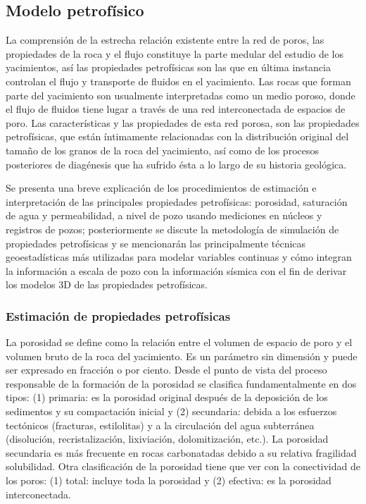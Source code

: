 \subsection{Modelo petrof\'isico}

La comprensi\'on de la estrecha relaci\'on existente entre la red de poros, las propiedades de la roca y el flujo constituye la parte medular del estudio de los yacimientos, as\'i las propiedades petrof\'isicas son las que en \'ultima instancia controlan el flujo y transporte de fluidos en el yacimiento. Las rocas que forman parte del yacimiento son usualmente interpretadas como un medio poroso, donde el flujo de fluidos tiene lugar a trav\'es de una red interconectada de espacios de poro. Las caracter\'isticas y las propiedades de esta red porosa, son las propiedades petrof\'isicas, que est\'an \'intimamente relacionadas con la distribuci\'on original del tama\~no de los granos de la roca del yacimiento, as\'i como de los procesos posteriores de diag\'enesis que ha sufrido \'esta a lo largo de su historia geol\'ogica.

Se presenta una breve explicaci\'on de los procedimientos de estimaci\'on e interpretaci\'on de las principales propiedades petrof\'isicas: porosidad, saturaci\'on de agua y permeabilidad, a nivel de pozo usando mediciones en n\'ucleos y registros de pozos; posteriormente se discute la metodolog\'ia de simulaci\'on de propiedades petrof\'isicas y se mencionar\'an las principalmente t\'ecnicas geoestad\'isticas m\'as utilizadas para modelar variables continuas y c\'omo integran la informaci\'on a escala de pozo con la informaci\'on s\'ismica con el fin de derivar los modelos 3D de las propiedades petrof\'isicas.

\subsubsection{Estimaci\'on de propiedades petrof\'isicas}

La porosidad se define como la relaci\'on entre el volumen de espacio de poro y el volumen bruto de la roca del yacimiento. Es un par\'ametro sin dimensi\'on y puede ser expresado en fracci\'on o por ciento. Desde el punto de vista del proceso responsable de la formaci\'on de la porosidad se clasifica fundamentalmente en dos tipos: (1) primaria: es la porosidad original despu\'es de la deposici\'on de los sedimentos y su compactaci\'on inicial y (2) secundaria: debida a los esfuerzos tect\'onicos (fracturas, estilolitas) y a la circulaci\'on del agua subterr\'anea (disoluci\'on, recristalizaci\'on, lixiviaci\'on, dolomitizaci\'on, etc.). La porosidad secundaria es m\'as frecuente en rocas carbonatadas debido a su relativa fragilidad solubilidad. Otra clasificaci\'on de la porosidad tiene que ver con la conectividad de los poros: (1) total: incluye toda la porosidad y (2) efectiva: es la porosidad interconectada.

